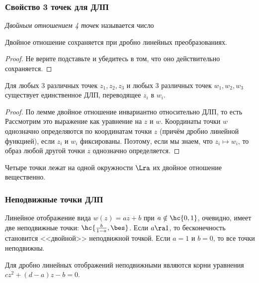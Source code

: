\documentclass[a4paper]{article}
\begin{document}
\subsubsection{Свойство 3 точек для ДЛП}

\begin{df}
\emph{Двойным отношением 4 точек} называется число
\end{df}

\begin{lemma}
Двойное отношение сохраняется при дробно линейных преобразованиях.
\end{lemma}
\begin{proof}
Не верите подставьте и убедитесь в том, что оно действительно сохраняется.
\end{proof}

\begin{theorem}
Для любых 3 различных точек $z_1, z_2, z_3$ и любых 3 различных точек $w_1, w_2, w_3$ существует единственное
ДЛП, переводящее $z_i$ в $w_i$.
\end{theorem}
\begin{proof}
По лемме двойное отношение инвариантно относительно ДЛП, то есть
Рассмотрим это выражение как уравнение на $z$ и $w$. Координаты точки $w$ однозначно определяются по координатам
точки $z$ (причём дробно линейной функцией), если $z_i$ и $w_i$ фиксированы. Поэтому, если мы знаем,
что $z_i\mapsto w_i$, то образ любой другой точки $z$ однозначно определяется.
\end{proof}

\begin{problem}
Четыре точки лежат на одной окружности $\Lra$ их двойное отношение вещественно.
\end{problem}

\subsubsection{Неподвижные точки ДЛП}

Линейное отображение вида $w(z) = az+b$ при $a\notin\hc{0,1}$, очевидно, имеет две
неподвижные точки: $\hc{\frac{b}{1-a},\bes}$. Если $a\ra 1$, то бесконечность становится <<двойной>> неподвижной точкой.
Если $a=1$ и $b=0$, то  все точки неподвижны.

Для дробно линейных отображений неподвижными являются корни уравнения $cz^2 + (d-a)z-b=0$.
\end{document}

